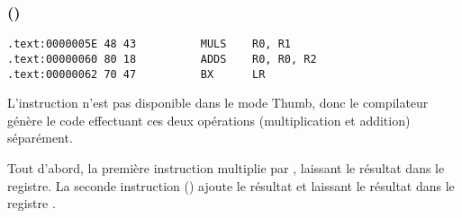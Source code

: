 \subsubsection{\OptimizingKeilVI (\ThumbMode)}

\begin{lstlisting}[label=ARM_leaf_example2,style=customasmARM]
.text:0000005E 48 43          MULS    R0, R1
.text:00000060 80 18          ADDS    R0, R0, R2
.text:00000062 70 47          BX      LR
\end{lstlisting}

L'instruction  n'est pas disponible dans le mode Thumb, donc le compilateur
génère le code effectuant ces deux opérations (multiplication et addition) séparément.

Tout d'abord, la première instruction  multiplie  par , laissant
le résultat dans le registre.
La seconde instruction () ajoute le résultat et  laissant le résultat
dans le registre .

